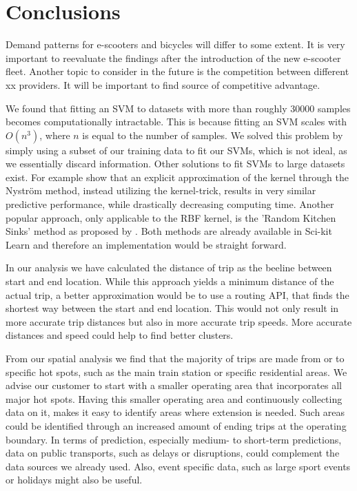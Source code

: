 \section{Conclusions}
\label{sec:conclusions}

Demand patterns for e-scooters and bicycles will differ to some extent. It is very important to reevaluate the findings after the introduction of the new e-scooter fleet. Another topic to consider in the future is the competition between different xx providers. It will be important to find source of competitive advantage. 



We found that fitting an SVM to datasets with more than roughly \(30000\) samples becomes computationally intractable.
This is because fitting an SVM scales with \(O(n^3)\), where \(n\) is equal to the number of samples.
We solved this problem by simply using a subset of our training data to fit our SVMs, which is not ideal, as we essentially discard information.
Other solutions to fit SVMs to large datasets exist. For example   show that an explicit approximation of the kernel through the Nyström method, instead utilizing the kernel-trick,  results in very similar predictive performance, while drastically decreasing computing time. Another popular approach, only applicable to the RBF kernel, is the 'Random Kitchen Sinks' method as proposed by . Both methods are already available in Sci-kit Learn and therefore an implementation would be straight forward.

In our analysis we have calculated the distance of trip as the beeline between start and end location. 
While this approach yields a minimum distance of the actual trip, a better approximation would be to use a routing API, that finds the shortest way between the start and end location. 
This would not only result in more accurate trip distances but also in more accurate trip speeds. 
More accurate distances and speed could help to find better clusters.

From our spatial analysis we find that the majority of trips are made from or to specific hot spots, such as the main train station or specific residential areas. 
We advise our customer to start with a smaller operating area that incorporates all major hot spots.
Having this smaller operating area and continuously collecting data on it, makes it easy to identify areas where extension is needed. Such areas could be identified through an increased amount of ending trips at the operating boundary.
In terms of prediction, especially medium- to short-term predictions, data on public transports, such as delays or disruptions, could complement the data sources we already used.
Also, event specific data, such as large sport events or holidays might also be useful.

